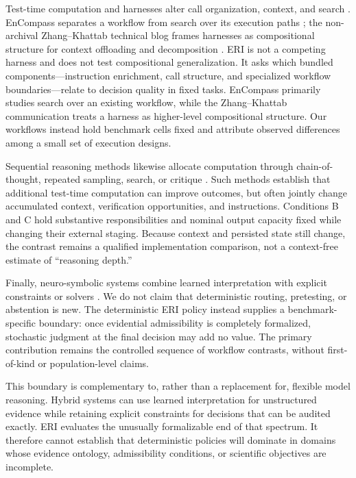 Test-time computation and harnesses alter call organization, context, and
search \citep{WeiEtAl2022CoT,WangEtAl2023SelfConsistency,
SnellEtAl2025TestTime}.  EnCompass separates a workflow from search over its
execution paths \citep{LiEtAl2025EnCompass}; the non-archival
Zhang--Khattab technical blog frames harnesses as compositional structure for
context offloading and decomposition \citep{ZhangKhattab2026Harness}.  ERI is
not a competing harness and does not test compositional generalization.  It
asks which bundled components---instruction enrichment, call structure, and
specialized workflow boundaries---relate to decision quality in fixed tasks.
EnCompass primarily studies search over an existing workflow, while the
Zhang--Khattab communication treats a harness as higher-level compositional
structure.  Our workflows instead hold benchmark cells fixed and attribute
observed differences among a small set of execution designs.

Sequential reasoning methods likewise allocate computation through
chain-of-thought, repeated sampling, search, or critique
\citep{WeiEtAl2022CoT,WangEtAl2023SelfConsistency,
SnellEtAl2025TestTime}.  Such methods establish that additional test-time
computation can improve outcomes, but often jointly change accumulated
context, verification opportunities, and instructions.  Conditions B and C
hold substantive responsibilities and nominal output capacity fixed while
changing their external staging.  Because context and persisted state still
change, the contrast remains a qualified implementation comparison, not a
context-free estimate of ``reasoning depth.''

Finally, neuro-symbolic systems combine learned interpretation with explicit
constraints or solvers \citep{PanEtAl2023LogicLM}.  We do not claim that
deterministic routing, pretesting, or abstention is new.  The deterministic ERI
policy instead supplies a benchmark-specific boundary: once evidential
admissibility is completely formalized, stochastic judgment at the final
decision may add no value.  The primary contribution remains the controlled
sequence of workflow contrasts, without first-of-kind or population-level claims.

This boundary is complementary to, rather than a replacement for, flexible
model reasoning.  Hybrid systems can use learned interpretation for
unstructured evidence while retaining explicit constraints for decisions that
can be audited exactly.  ERI evaluates the unusually formalizable end of that
spectrum.  It therefore cannot establish that deterministic policies will
dominate in domains whose evidence ontology, admissibility conditions, or
scientific objectives are incomplete.
